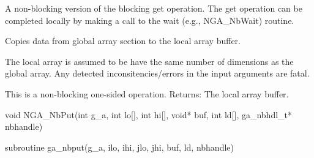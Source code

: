 \documentclass[12pt]{article}
\begin{document}
\ncoll
\begin{desc}

A non-blocking version of the blocking get operation. The get operation can be completed locally by making a call to the wait (e.g., NGA_NbWait) routine.

Copies data from global array section to the local array buffer.

The local array is assumed to be have the same number of dimensions as the global array. Any detected inconsitencies/errors in the input arguments are fatal.

This is a non-blocking one-sided operation.
Returns: 
The local array buffer. 

\end{desc}


\begin{capi}
\begin{ccode}
void NGA_NbPut(int g_a, int lo[], int hi[], void* buf, int ld[], 
ga_nbhdl_t* nbhandle)
\end{ccode}
\begin{funcargs}
\end{funcargs}
\end{capi}

\begin{f2dapi}
\begin{fcode}
subroutine ga_nbput(g_a, ilo, ihi, jlo, jhi, buf, ld, nbhandle)
\end{fcode}
\begin{funcargs}
\end{funcargs}
\end{f2dapi}
\end{document}

